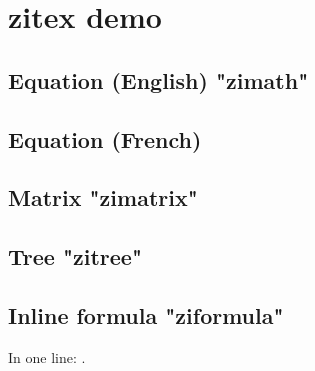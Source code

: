 \documentclass{article}
\begin{document}
\section*{zitex demo}

\subsection*{Equation (English) "zimath"}

\subsection*{Equation (French)}

\subsection*{Matrix "zimatrix"}



\subsection*{Tree "zitree"}


\subsection*{Inline formula "ziformula"}
In one line: .
\end{document}
